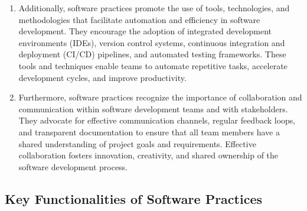\begin{enumerate}
    \item Additionally, software practices promote the use of tools, technologies, and methodologies that facilitate automation and efficiency in software development. They encourage the adoption of integrated development environments (IDEs), version control systems, continuous integration and deployment (CI/CD) pipelines, and automated testing frameworks. These tools and techniques enable teams to automate repetitive tasks, accelerate development cycles, and improve productivity.

    \item Furthermore, software practices recognize the importance of collaboration and communication within software development teams and with stakeholders. They advocate for effective communication channels, regular feedback loops, and transparent documentation to ensure that all team members have a shared understanding of project goals and requirements. Effective collaboration fosters innovation, creativity, and shared ownership of the software development process.

\end{enumerate}

\subsection*{Key Functionalities of Software Practices}

